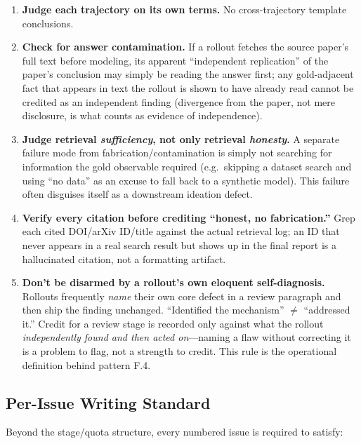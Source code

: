 \begin{enumerate}
  \item \textbf{Judge each trajectory on its own terms.} No
  cross-trajectory template conclusions.

  \item \textbf{Check for answer contamination.} If a rollout fetches the
  source paper's full text before modeling, its apparent ``independent
  replication'' of the paper's conclusion may simply be reading the answer
  first; any gold-adjacent fact that appears in text the rollout is shown
  to have already read cannot be credited as an independent finding
  (divergence from the paper, not mere disclosure, is what counts as
  evidence of independence).

  \item \textbf{Judge retrieval \emph{sufficiency}, not only retrieval
  \emph{honesty}.} A separate failure mode from fabrication/contamination
  is simply not searching for information the gold observable required
  (e.g.\ skipping a dataset search and using ``no data'' as an excuse to
  fall back to a synthetic model). This failure often disguises itself as
  a downstream ideation defect.

  \item \textbf{Verify every citation before crediting ``honest, no
  fabrication.''} Grep each cited DOI/arXiv ID/title against the actual
  retrieval log; an ID that never appears in a real search result but
  shows up in the final report is a hallucinated citation, not a
  formatting artifact.

  \item \textbf{Don't be disarmed by a rollout's own eloquent
  self-diagnosis.} Rollouts frequently \emph{name} their own core defect
  in a review paragraph and then ship the finding unchanged.
  ``Identified the mechanism'' $\neq$ ``addressed it.'' Credit for a
  review stage is recorded only against what the rollout
  \emph{independently found and then acted on}---naming a flaw without
  correcting it is a problem to flag, not a strength to credit. This rule
  is the operational definition behind pattern F.4.
\end{enumerate}

\subsection{Per-Issue Writing Standard}
\label{app:evaluator:writing}

Beyond the stage/quota structure, every numbered issue is required to
satisfy:

